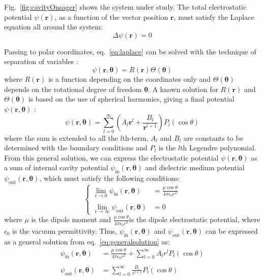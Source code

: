 \documentclass[11pt,oneside,a4paper]{article}
\begin{document}
Fig.~\ref{fig:cavityOnsager} shows the system under study. The total electrostatic potential $\psi(\mathbf{r})$, as a function of the vector position $\mathbf{r}$, must satisfy the Laplace equation all around the system: 
\begin{equation}
\label{eq:laplace}
\Delta \psi(\mathbf{r}) = 0
\end{equation}

Passing to polar coordinates, eq.~\ref{eq:laplace}  can be solved with the technique of separation of variables :
\begin{equation}
 \label{eq:separation}
 \psi(\mathbf{r},\mathbf{\theta}) = R(\mathbf{r})\Theta(\mathbf{\theta})
\end{equation}
where $R(\mathbf{r})$ is a function depending on the coordinates only  and $\Theta(\mathbf{\theta})$ depends on the rotational degree of freedom $\mathbf{\theta}$. 
A known solution for $R(\mathbf{r})$ and $\Theta(\mathbf{\theta})$ is based on the use of spherical harmonics, giving a final potential $\psi(\mathbf{r},\mathbf{\theta})$ : 
\begin{equation}
 \label{eq:generalsolution}
 \psi(\mathbf{r},\mathbf{\theta}) = \sum_{l=0}^{\infty} \left ( A_{l} \mathbf{r}^{l} +  \frac{B_{l}}{\mathbf{r}^{l+1}} \right )  P_{l}(\cos\theta)
\end{equation}
where the sum is extended to all the $l$th-term, $A_{l}$ and $B_{l}$ are constants to be determined with the boundary conditions and $P_{l}$ is the $l$th Legendre polynomial. 
From this general solution, we can express the electrostatic potential $\psi(\mathbf{r},\mathbf{\theta})$ as a sum of internal cavity potential $\psi_\mathrm{in}(\mathbf{r},\mathbf{\theta})$ and dielectric medium potential $\psi_\mathrm{out}(\mathbf{r},\mathbf{\theta})$, which must satisfy the following conditions:
\begin{equation}
\begin{cases}
 \lim_{\mathrm{r\to 0}} \psi_\mathrm{in}(\mathbf{r},\mathbf{\theta}) &= \frac{\mu\cos\theta}{4\pi\epsilon_0 r^2}\\
 \\
 \lim_{\mathrm{r\to \infty}} \psi_\mathrm{out}(\mathbf{r},\mathbf{\theta}) &=  0
\end{cases}
\end{equation}
where $\mu$ is the dipole moment and $\frac{\mu\cos\theta}{4\pi\epsilon_0 r^2}$is the dipole electrostatic potential, where $\epsilon_0$ is the vacuum permittivity. Thus, $\psi_\mathrm{in}(\mathbf{r},\mathbf{\theta})$ and  $\psi_\mathrm{out}(\mathbf{r},\mathbf{\theta})$ can be expressed as a general solution from eq.~\ref{eq:generalsolution} as:
\begin{equation}
 \label{eq:psiinpsiout}
 \begin{align} 
 \psi_\mathrm{in}(\mathbf{r},\mathbf{\theta}) &= \frac{\mu \cos\theta}{4\pi\epsilon_0 r^2} + \sum_{l=0}^\infty A_{l} r^{l}P_{l}(\cos\theta) \\
 \\
 \psi_\mathrm{out}(\mathbf{r},\mathbf{\theta}) &= \sum_{l=0}^\infty \frac{B_{l}}{r^{l+1}} P_{l}(\cos\theta) 
  \end{align}
\end{equation}
 
\end{document}
